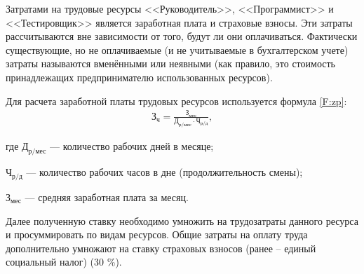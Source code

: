 
Затратами на трудовые ресурсы <<Руководитель>>, <<Программист>> и <<Тестировщик>> является заработная плата и страховые взносы. Эти затраты рассчитываются вне зависимости от того, будут ли они оплачиваться. Фактически существующие, но не оплачиваемые (и не учитываемые в бухгалтерском учете) затраты называются вменёнными или неявными (как правило, это стоимость принадлежащих предпринимателю использованных ресурсов).

Для расчета заработной платы трудовых ресурсов используется формула \ref{F:zp}:
\begin{equation}
	\begin{aligned}
		\text{З}_\text{ч}=\frac{\text{З}_\text{мес}}{\text{Д}_\text{р/мес} \cdot \text{Ч}_\text{р/д}} ,
	\end{aligned}
	\label{F:zp}
\end{equation}

где $\text{Д}_\text{р/мес}$ --- количество рабочих дней в месяце;

$\text{Ч}_\text{р/д}$ --- количество рабочих часов в дне (продолжительность смены);

$\text{З}_\text{мес}$ --- средняя заработная плата за месяц.

Далее полученную ставку необходимо умножить на трудозатраты данного ресурса и просуммировать по видам ресурсов. Общие затраты на оплату труда дополнительно умножают на ставку страховых взносов (ранее – единый социальный налог) (30 \%).

